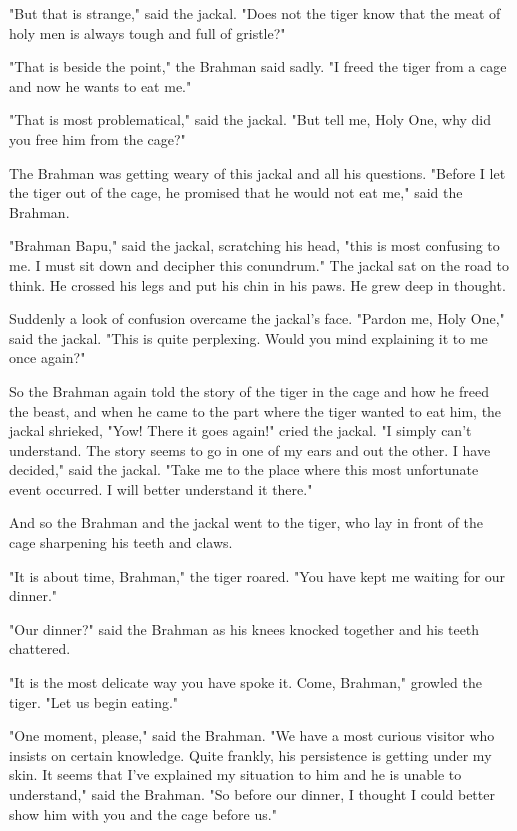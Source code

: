 "But that is strange," said the jackal. "Does not the tiger know that the meat of holy men is always tough and full of gristle?"

"That is beside the point," the Brahman said sadly. "I freed the tiger from a cage and now he wants to eat me."

"That is most problematical," said the jackal. "But tell me, Holy One, why did you free him from the cage?"

The Brahman was getting weary of this jackal and all his questions. "Before I let the tiger out of the cage, he promised that he would not eat me," said the Brahman.

"Brahman Bapu," said the jackal, scratching his head, "this is most confusing to me. I must sit down and decipher this conundrum." The jackal sat on the road to think. He crossed his legs and put his chin in his paws. He grew deep in thought.

Suddenly a look of confusion overcame the jackal's face. "Pardon me, Holy One," said the jackal. "This is quite perplexing. Would you mind explaining it to me once again?"

So the Brahman again told the story of the tiger in the cage and how he freed the beast, and when he came to the part where the tiger wanted to eat him, the jackal shrieked, "Yow! There it goes again!" cried the jackal. "I simply can't understand. The story seems to go in one of my ears and out the other. I have decided," said the jackal. "Take me to the place where this most unfortunate event occurred. I will better understand it there."

And so the Brahman and the jackal went to the tiger, who lay in front of the cage sharpening his teeth and claws.

"It is about time, Brahman," the tiger roared. "You have kept me waiting for our dinner."

"Our dinner?" said the Brahman as his knees knocked together and his teeth chattered.

"It is the most delicate way you have spoke it. Come, Brahman," growled the tiger. "Let us begin eating."

"One moment, please," said the Brahman. "We have a most curious visitor who insists on certain knowledge. Quite frankly, his persistence is getting under my skin. It seems that I've explained my situation to him and he is unable to understand," said the Brahman. "So before our dinner, I thought I could better show him with you and the cage before us."

